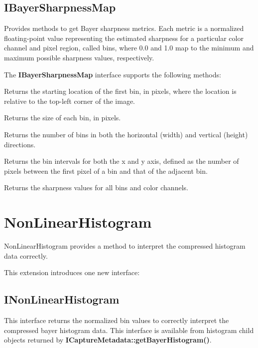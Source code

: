 \documentclass[11pt]{article}
\newcommand{\classname}[1]{\textbf{#1}}
\newcommand{\methodname}[1]{\textbf{#1}}
\begin{document}
\subsection{IBayerSharpnessMap} Provides methods to get Bayer sharpness metrics. Each metric
is a normalized floating-point value representing the estimated sharpness for a particular color
channel and pixel region, called bins, where 0.0 and 1.0 map to the minimum and maximum possible
sharpness values, respectively.

The \classname{IBayerSharpnessMap} interface supports the following methods:

\begin{description}[style=nextline,align=left,leftmargin=4em]
\item[getBinStart()] Returns the starting location of the first bin, in pixels, where the
location is relative to the top-left corner of the image.
\item[getBinSize()] Returns the size of each bin, in pixels.
\item[getBinCount()] Returns the number of bins in both the horizontal (width) and vertical
(height) directions.
\item[getBinInterval()] Returns the bin intervals for both the x and y axis, defined as the
number of pixels between the first pixel of a bin and that of the adjacent bin.
\item[getSharpnessValue()] Returns the sharpness values for all bins and color channels.
\end{description}

\section{NonLinearHistogram}

NonLinearHistogram provides a method to interpret the compressed histogram data correctly.

This extension introduces one new interface:
\subsection{INonLinearHistogram} This interface returns the normalized bin values to correctly
interpret the compressed bayer histogram data. This interface is available from histogram child
objects returned by \methodname{ICaptureMetadata::getBayerHistogram()}.
\end{document}
